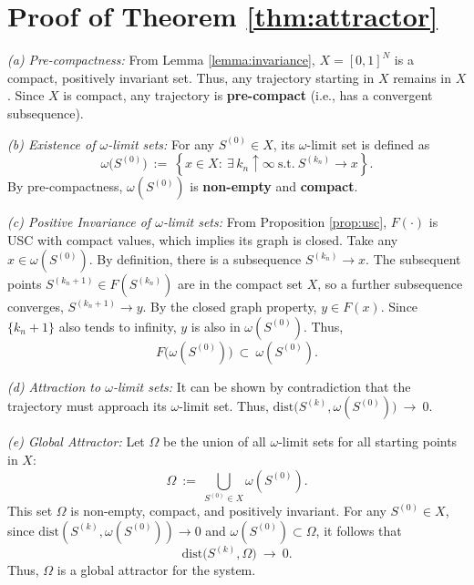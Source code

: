 \documentclass[journal]{IEEEtran}
\begin{document}
\section{Proof of Theorem \ref{thm:attractor}}
\label{app:proof_thm_attractor}
\begin{IEEEproof}
\textit{(a) Pre-compactness:}
From Lemma \ref{lemma:invariance}, $X=[0,1]^N$ is a compact, positively invariant set. Thus, any trajectory starting in $X$ remains in $X$. Since $X$ is compact, any trajectory is \textbf{pre-compact} (i.e., has a convergent subsequence).

\textit{(b) Existence of $\omega$-limit sets:}
For any $S^{(0)}\in X$, its $\omega$-limit set is defined as
\begin{equation}
\omega\big(S^{(0)}\big)\ :=\ \left\{x\in X:\ \exists\,k_n\uparrow\infty\ \text{s.t.}\ S^{(k_n)}\to x\right\}.
\end{equation}
By pre-compactness, $\omega(S^{(0)})$ is \textbf{non-empty} and \textbf{compact}.

\textit{(c) Positive Invariance of $\omega$-limit sets:}
From Proposition \ref{prop:usc}, $F(\cdot)$ is USC with compact values, which implies its graph is closed. Take any $x \in \omega(S^{(0)})$. By definition, there is a subsequence $S^{(k_n)} \to x$. The subsequent points $S^{(k_n+1)} \in F(S^{(k_n)})$ are in the compact set $X$, so a further subsequence converges, $S^{(k_n+1)} \to y$. By the closed graph property, $y \in F(x)$. Since $\{k_n+1\}$ also tends to infinity, $y$ is also in $\omega(S^{(0)})$. Thus,
\begin{equation}
F\big(\omega(S^{(0)})\big)\ \subset\ \omega(S^{(0)}).
\end{equation}

\textit{(d) Attraction to $\omega$-limit sets:}
It can be shown by contradiction that the trajectory must approach its $\omega$-limit set. Thus, $\mathrm{dist}\big(S^{(k)},\omega(S^{(0)})\big)\ \to\ 0$.

\textit{(e) Global Attractor:}
Let $\Omega$ be the union of all $\omega$-limit sets for all starting points in $X$:
\begin{equation}
\Omega\ :=\ \bigcup_{S^{(0)}\in X} \omega(S^{(0)}).
\end{equation}
This set $\Omega$ is non-empty, compact, and positively invariant. For any $S^{(0)}\in X$, since $\mathrm{dist}(S^{(k)},\omega(S^{(0)}))\to 0$ and $\omega(S^{(0)})\subset\Omega$, it follows that
\begin{equation}
\mathrm{dist}\big(S^{(k)},\Omega\big)\ \to\ 0.
\end{equation}
Thus, $\Omega$ is a global attractor for the system.
\end{IEEEproof}
\end{document}
